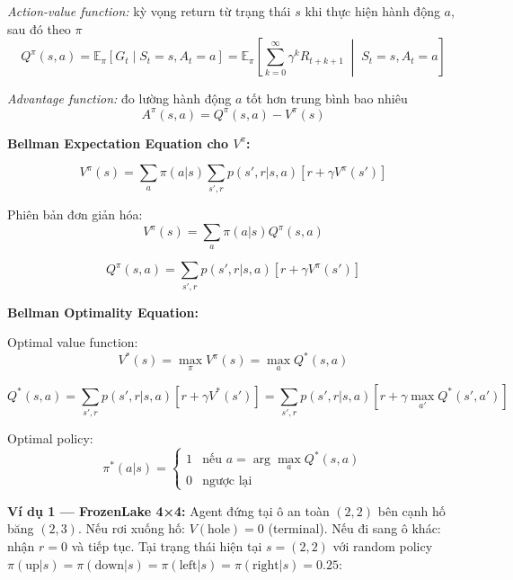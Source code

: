 \documentclass[12pt,a4paper]{article}
\begin{document}
\textit{Action-value function:} kỳ vọng return từ trạng thái $s$ khi thực hiện hành động $a$, sau đó theo $\pi$
\begin{equation}
Q^\pi(s,a) = \mathbb{E}_\pi[G_t \mid S_t=s, A_t=a] = \mathbb{E}_\pi\left[\sum_{k=0}^{\infty} \gamma^k R_{t+k+1} \;\middle|\; S_t=s, A_t=a\right]
\end{equation}

\textit{Advantage function:} đo lường hành động $a$ tốt hơn trung bình bao nhiêu
\begin{equation}
A^\pi(s,a) = Q^\pi(s,a) - V^\pi(s)
\end{equation}

\textbf{Bellman Expectation Equation cho $V^\pi$:}

\begin{equation}
V^\pi(s) = \sum_{a} \pi(a|s) \sum_{s',r} p(s',r|s,a) \left[ r + \gamma V^\pi(s') \right]
\end{equation}

Phiên bản đơn giản hóa:
\begin{equation}
V^\pi(s) = \sum_{a} \pi(a|s) Q^\pi(s,a)
\end{equation}

\begin{equation}
Q^\pi(s,a) = \sum_{s',r} p(s',r|s,a) \left[ r + \gamma V^\pi(s') \right]
\end{equation}

\textbf{Bellman Optimality Equation:}

Optimal value function:
\begin{equation}
V^*(s) = \max_\pi V^\pi(s) = \max_a Q^*(s,a)
\end{equation}

\begin{equation}
Q^*(s,a) = \sum_{s',r} p(s',r|s,a) \left[ r + \gamma V^*(s') \right] = \sum_{s',r} p(s',r|s,a) \left[ r + \gamma \max_{a'} Q^*(s',a') \right]
\end{equation}

Optimal policy:
\begin{equation}
\pi^*(a|s) = \begin{cases} 1 & \text{nếu } a = \arg\max_a Q^*(s,a) \\ 0 & \text{ngược lại} \end{cases}
\end{equation}

\textbf{Ví dụ 1 --- FrozenLake 4×4:} Agent đứng tại ô an toàn $(2,2)$ bên cạnh hố băng $(2,3)$. Nếu rơi xuống hố: $V(\text{hole}) = 0$ (terminal). Nếu đi sang ô khác: nhận $r=0$ và tiếp tục. Tại trạng thái hiện tại $s=(2,2)$ với random policy $\pi(\text{up}|s)=\pi(\text{down}|s)=\pi(\text{left}|s)=\pi(\text{right}|s)=0.25$:
\end{document}
